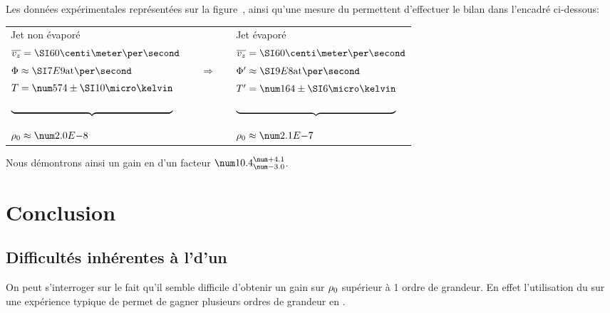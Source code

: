 \Resultat%
{
\noindent
Les données expérimentales représentées sur la figure~, ainsi qu'une mesure du \fat permettent d'effectuer le bilan dans l'encadré ci-dessous:
\vspace{1ex}
\begin{center}
\begin{tabular}{|lcccl|}
\hline
  Jet non évaporé   &    & &  &  Jet évaporé   %
\\
$\vjet = \cmps{60}$  &    &  &  &  $\vjet = \cmps{60}$    %
\\
$\flux \approx \atps{7E{9}}$ &  &\huge{${\Longrightarrow}$} & & $\fluxapres \approx \atps{9E{8}}$     %
\\
$T = \microKpm{574}{10}$ & & & & $T' = \microKpm{164}{6}$   \vspace{-2.5ex} %
\\
$\underbrace{\phantom{T = \microKpm{574}{10}}}_{}$  &  &  &    & $\underbrace{\phantom{T' = \microKpm{164}{6}}}_{}$  \vspace{-1ex}
\\
$\rhojetaxe \approx \val{2.0E{-8}}$ & & & & $\rhojetaxe \approx\val{2.1E{-7}}$\\ %
\hline
\end{tabular}	
\end{center}
\vspace{1ex}
Nous démontrons ainsi un gain en \ddedpup d'un facteur $\val{10.4}^\val{+4.1}_\val{-3.0}$. 
}

\section{Conclusion}
	\subsection{Difficultés inhérentes à l'\evap d'un \jatg}\label{sec:DifficultesInherentes}
On peut s'interroger sur le fait qu'il semble difficile d'obtenir un gain sur ${\rho_{0}}$ supérieur à 1 ordre de grandeur. En effet l'utilisation du \rpef sur une expérience typique de \condbe permet de gagner plusieurs ordres de grandeur en \ddedpup.

